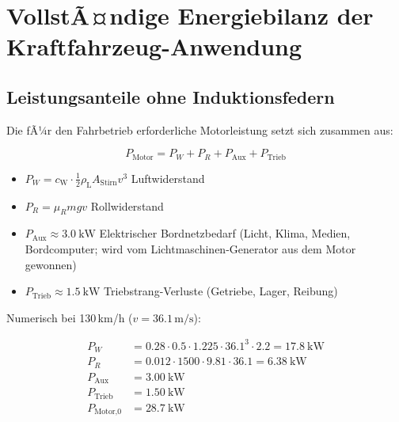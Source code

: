 ﻿\documentclass[12pt, a4paper]{report}
\theoremstyle{definition}
\theoremstyle{remark}
\newcommand{\rhoL}{\rho_{\text{L}}}
\newcommand{\cW}{c_{\text{W}}}
\newcommand{\Astirnfl}{A_{\text{Stirn}}}
\begin{document}
\chapter{VollstÃ¤ndige Energiebilanz der Kraftfahrzeug-Anwendung}
\label{chap:energiebilanz}

\section{Leistungsanteile ohne Induktionsfedern}

Die fÃ¼r den Fahrbetrieb erforderliche Motorleistung setzt sich zusammen aus:

\begin{equation}
  P_{\text{Motor}} = P_W + P_R + P_{\text{Aux}} + P_{\text{Trieb}}
  \label{eq:p_motor}
\end{equation}

\begin{itemize}
  \item $P_W = \cW \cdot \frac{1}{2}\rhoL \Astirnfl v^3$ \quad Luftwiderstand
  \item $P_R = \mu_R m g v$ \quad Rollwiderstand
  \item $P_{\text{Aux}} \approx \SI{3.0}{\kilo\watt}$ \quad Elektrischer Bordnetzbedarf
        (Licht, Klima, Medien, Bordcomputer; wird vom Lichtmaschinen-Generator
        aus dem Motor gewonnen)
  \item $P_{\text{Trieb}} \approx \SI{1.5}{\kilo\watt}$ \quad Triebstrang-Verluste
        (Getriebe, Lager, Reibung)
\end{itemize}

Numerisch bei 130\,km/h ($v = 36.1\,\text{m/s}$):

\begin{align}
  P_W     &= 0.28 \cdot 0.5 \cdot 1.225 \cdot 36.1^3 \cdot 2.2 = \SI{17.8}{\kilo\watt} \\
  P_R     &= 0.012 \cdot 1500 \cdot 9.81 \cdot 36.1  = \SI{6.38}{\kilo\watt} \\
  P_{\text{Aux}}   &= \SI{3.00}{\kilo\watt} \\
  P_{\text{Trieb}} &= \SI{1.50}{\kilo\watt} \\
  P_{\text{Motor,0}} &= \SI{28.7}{\kilo\watt}
  \label{eq:p_motor_130}
\end{align}
\end{document}
